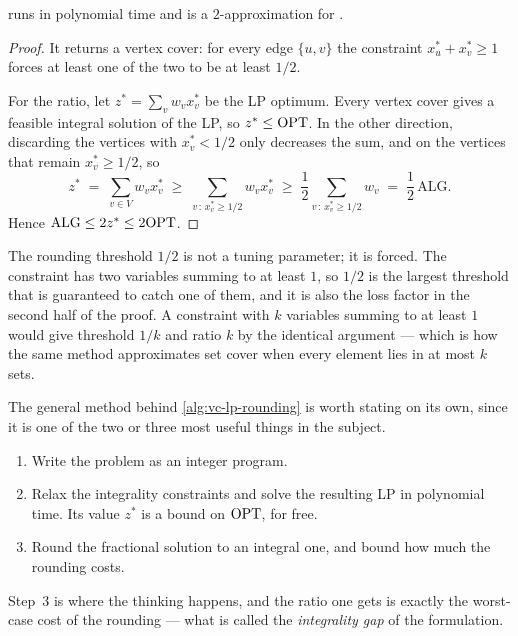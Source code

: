 \begin{theorem}\label{thm:vc-lp-rounding}
 runs in polynomial time and is a $2$-approximation
for .
\end{theorem}

\begin{proof}
It returns a vertex cover: for every edge $\{u,v\}$ the constraint
$x^{*}_u + x^{*}_v \ge 1$ forces at least one of the two to be at least $1/2$.

For the ratio, let $z^{*} = \sum_v w_v x^{*}_v$ be the LP optimum. Every vertex
cover gives a feasible integral solution of the LP, so $z^{*} \le \mathrm{OPT}$. In the
other direction, discarding the vertices with $x^{*}_v < 1/2$ only decreases the
sum, and on the vertices that remain $x^{*}_v \ge 1/2$, so
\[
  z^{*} \;=\; \sum_{v \in V} w_v x^{*}_v
        \;\ge\; \sum_{v \,:\, x^{*}_v \ge 1/2} w_v x^{*}_v
        \;\ge\; \frac12 \sum_{v \,:\, x^{*}_v \ge 1/2} w_v
        \;=\; \frac12\,\mathrm{ALG}.
\]
Hence $\mathrm{ALG} \le 2 z^{*} \le 2\mathrm{OPT}$.
\end{proof}

\begin{intuition}
The rounding threshold $1/2$ is not a tuning parameter; it is forced. The
constraint has two variables summing to at least $1$, so $1/2$ is the largest
threshold that is guaranteed to catch one of them, and it is also the loss
factor in the second half of the proof. A constraint with $k$ variables summing
to at least $1$ would give threshold $1/k$ and ratio $k$ by the identical
argument --- which is how the same method approximates set cover when every
element lies in at most $k$ sets.
\end{intuition}

The general method behind \cref{alg:vc-lp-rounding} is worth stating on its
own, since it is one of the two or three most useful things in the subject.

\begin{enumerate}[leftmargin=*]
  \item Write the problem as an integer program.
  \item Relax the integrality constraints and solve the resulting LP in
        polynomial time. Its value $z^{*}$ is a bound on $\mathrm{OPT}$, for free.
  \item Round the fractional solution to an integral one, and bound how much
        the rounding costs.
\end{enumerate}
Step~3 is where the thinking happens, and the ratio one gets is exactly the
worst-case cost of the rounding --- what is called the \emph{integrality gap}
of the formulation.


